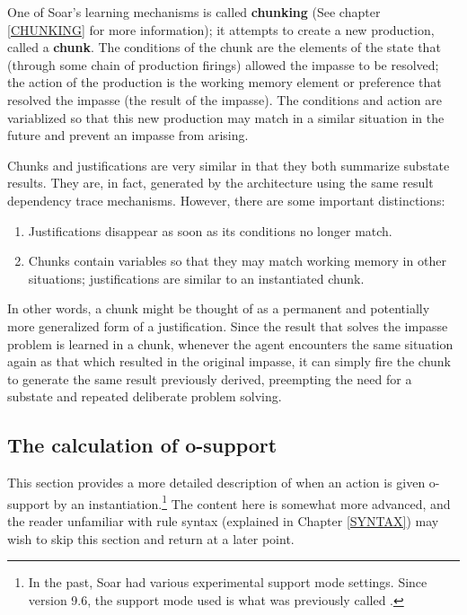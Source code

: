 One of Soar's learning mechanisms is called \textbf{chunking} (See chapter \ref{CHUNKING} for more information); it attempts to create a new production, called a \textbf{chunk}. The conditions of the chunk are the elements of the state that (through some chain of production firings) allowed the impasse to be resolved; the action of the production is the working memory element or preference that resolved the impasse (the result of the impasse). The conditions and action are variablized so that this new production may match in a similar situation in the future and prevent an impasse from arising. 

Chunks and justifications are very similar in that they both summarize substate results. They are, in fact, generated by the architecture using the same result dependency trace mechanisms. However, there are some important distinctions:

\vspace{-12pt}
\begin{enumerate}
	\item Justifications disappear as soon as its conditions no longer match. 
	\vspace{-8pt}
	\item Chunks contain variables so that they may match working memory in other situations; justifications are similar to an instantiated chunk.
\end{enumerate}

In other words, a chunk might be thought of as a permanent and potentially more generalized form of a justification. Since the result that solves the impasse problem is learned in a chunk, whenever the agent encounters the same situation again as that which resulted in the original impasse, it can simply fire the chunk to generate the same result previously derived, preempting the need for a substate and repeated deliberate problem solving.


\subsection{The calculation of o-support}
\label{SUPPORT}

This section provides a more detailed description of when an action is given o-support by an instantiation.\footnote{
	In the past, Soar had various experimental support mode settings. Since version 9.6, the support mode used is what was previously called .} 
The content here is somewhat more advanced, and the reader unfamiliar with rule syntax (explained in Chapter \ref{SYNTAX}) may wish to skip this section and return at a later point.

